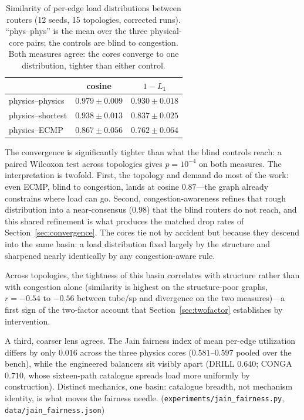 \begin{table}[t]
\centering
\caption{Similarity of per-edge load distributions between routers (12 seeds,
15 topologies, corrected runs). ``phys--phys'' is the mean over the three
physical-core pairs; the controls are blind to congestion. Both measures
agree: the cores converge to one distribution, tighter than either control.}
\label{tab:attractor}
\small
\begin{tabular}{lcc}
\toprule
 & cosine & $1-L_1$ \\
\midrule
physics--physics  & $0.979 \pm 0.009$ & $0.930 \pm 0.018$ \\
physics--shortest & $0.938 \pm 0.013$ & $0.837 \pm 0.025$ \\
physics--ECMP     & $0.867 \pm 0.056$ & $0.762 \pm 0.064$ \\
\bottomrule
\end{tabular}
\end{table}

The convergence is significantly tighter than what the blind controls reach: a
paired Wilcoxon test across topologies gives $p = 10^{-4}$ on both measures.
The interpretation is twofold. First, the topology and demand do most of the
work: even ECMP, blind to congestion, lands at cosine $0.87$---the graph
already constrains where load can go. Second, congestion-awareness refines
that rough distribution into a near-consensus ($0.98$) that the blind routers
do not reach, and this shared refinement is what produces the matched drop
rates of Section~\ref{sec:convergence}. The cores tie not by accident but
because they descend into the same basin: a load distribution fixed largely by
the structure and sharpened nearly identically by any congestion-aware rule.

Across topologies, the tightness of this basin correlates with structure
rather than with congestion alone (similarity is highest on the
structure-poor graphs, $r=-0.54$ to $-0.56$ between tube/sp and divergence on
the two measures)---a first sign of the two-factor account that
Section~\ref{sec:twofactor} establishes by intervention.


\medskip
A third, coarser lens agrees. The Jain fairness index of mean per-edge
utilization differs by only $0.016$ across the three physics cores
($0.581$--$0.597$ pooled over the bench), while the engineered balancers
sit visibly apart (DRILL $0.640$; CONGA $0.710$, whose sixteen-path
catalogue spreads load more uniformly by construction). Distinct
mechanics, one basin: catalogue breadth, not mechanism identity, is what
moves the fairness needle.
(\texttt{experiments/jain\_fairness.py},
\texttt{data/jain\_fairness.json})
